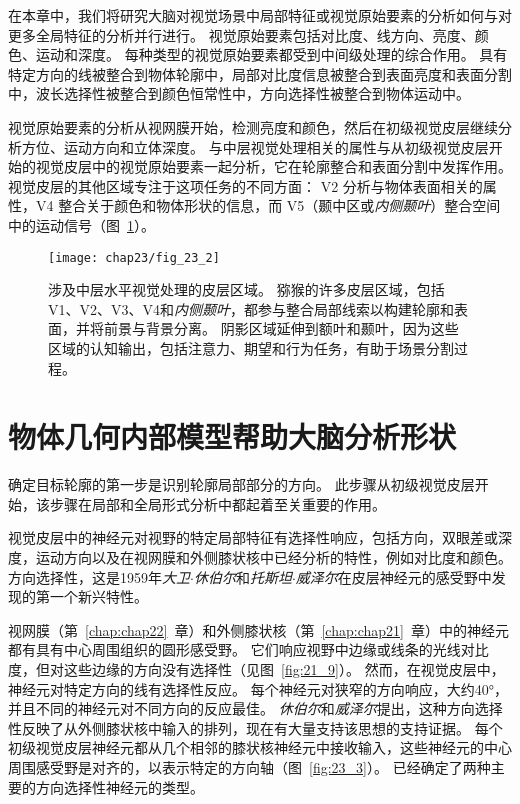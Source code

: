 在本章中，我们将研究大脑对视觉场景中局部特征或视觉原始要素的分析如何与对更多全局特征的分析并行进行。
视觉原始要素包括对比度、线方向、亮度、颜色、运动和深度。
每种类型的视觉原始要素都受到中间级处理的综合作用。
具有特定方向的线被整合到物体轮廓中，局部对比度信息被整合到表面亮度和表面分割中，波长选择性被整合到颜色恒常性中，方向选择性被整合到物体运动中。


视觉原始要素的分析从视网膜开始，检测亮度和颜色，然后在初级视觉皮层继续分析方位、运动方向和立体深度。
与中层视觉处理相关的属性与从初级视觉皮层开始的视觉皮层中的视觉原始要素一起分析，它在轮廓整合和表面分割中发挥作用。
视觉皮层的其他区域专注于这项任务的不同方面：
V2 分析与物体表面相关的属性，V4 整合关于颜色和物体形状的信息，而 V5（颞中区或\textit{内侧颞叶}）整合空间中的运动信号（图~\ref{fig:23_2}）。


\begin{figure}[htbp]
	\centering
	\texttt{[image: chap23/fig\_23\_2]}
	\caption{涉及中层水平视觉处理的皮层区域。
		猕猴的许多皮层区域，包括V1、V2、V3、V4和\textit{内侧颞叶}，都参与整合局部线索以构建轮廓和表面，并将前景与背景分离。
		阴影区域延伸到额叶和颞叶，因为这些区域的认知输出，包括注意力、期望和行为任务，有助于场景分割过程。}
	\label{fig:23_2}
\end{figure}



\section{物体几何内部模型帮助大脑分析形状}

确定目标轮廓的第一步是识别轮廓局部部分的方向。
此步骤从初级视觉皮层开始，该步骤在局部和全局形式分析中都起着至关重要的作用。


视觉皮层中的神经元对视野的特定局部特征有选择性响应，包括方向，双眼差或深度，运动方向以及在视网膜和外侧膝状核中已经分析的特性，例如对比度和颜色。 
方向选择性，这是1959年\textit{大卫$\cdot$休伯尔}和\textit{托斯坦$\cdot$威泽尔}在皮层神经元的感受野中发现的第一个新兴特性。


视网膜（第~\ref{chap:chap22}~章）和外侧膝状核（第~\ref{chap:chap21}~章）中的神经元都有具有中心周围组织的圆形感受野。
它们响应视野中边缘或线条的光线对比度，但对这些边缘的方向没有选择性（见图~\ref{fig:21_9}）。
然而，在视觉皮层中，神经元对特定方向的线有选择性反应。
每个神经元对狭窄的方向响应，大约40°，并且不同的神经元对不同方向的反应最佳。
\textit{休伯尔}和\textit{威泽尔}提出，这种方向选择性反映了从外侧膝状核中输入的排列，现在有大量支持该思想的支持证据。
每个初级视觉皮层神经元都从几个相邻的膝状核神经元中接收输入，这些神经元的中心周围感受野是对齐的，以表示特定的方向轴（图~\ref{fig:23_3}）。
已经确定了两种主要的方向选择性神经元的类型。


